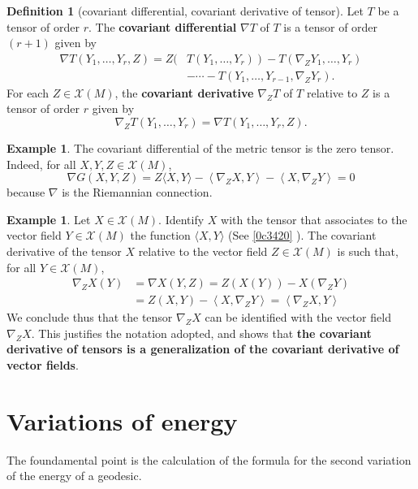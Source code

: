 \documentclass{amsart}
\theoremstyle{plain}
\theoremstyle{definition}
\newtheorem{definition}[theorem]{Definition}
\newtheorem{example}[theorem]{Example}
\theoremstyle{remark}
\begin{document}
\begin{definition}[covariant differential, covariant derivative of tensor]
Let $T$ be a tensor of order $r$. The \textbf{covariant differential} $\nabla T$ of $T$ is a tensor of order $(r+1)$ given by
\[
\begin{aligned}
\nabla T\left(Y_1, \ldots, Y_r, Z\right)=Z( & \left.T\left(Y_1, \ldots, Y_r\right)\right)-T\left(\nabla_Z Y_1, \ldots, Y_r\right) \\
& -\cdots-T\left(Y_1, \ldots, Y_{r-1}, \nabla_Z Y_r\right) .
\end{aligned}
\]For each $Z \in \mathcal{X}(M)$, the \textbf{covariant derivative} $\nabla_Z T$ of $T$ relative to $Z$ is a tensor of order $r$ given by
\[
\nabla_Z T\left(Y_1, \ldots, Y_r\right)=\nabla T\left(Y_1, \ldots, Y_r, Z\right) .
\]
\end{definition}
\begin{example}
The covariant differential of the metric tensor is the zero tensor. Indeed, for all $X, Y, Z \in \mathcal{X}(M)$,
\[
\nabla G(X, Y, Z)=Z\langle X, Y\rangle-\left\langle\nabla_Z X, Y\right\rangle-\left\langle X, \nabla_Z Y\right\rangle=0
\]because $\nabla$ is the Riemannian connection.
\end{example}
\begin{example}
Let $X \in \mathcal{X}(M)$. Identify $X$ with the tensor that associates to the vector field $Y \in \mathcal{X}(M)$ the function $\langle X, Y\rangle$ (See \cref{0c3420} ). The covariant derivative of the tensor $X$ relative to the vector field $Z \in \mathcal{X}(M)$ is such that, for all $Y \in \mathcal{X}(M)$,
\[
\begin{aligned}
\nabla_Z X(Y) & =\nabla X(Y, Z)=Z(X(Y))-X\left(\nabla_Z Y\right) \\
& =Z(X, Y)-\left\langle X, \nabla_Z Y\right\rangle=\left\langle\nabla_Z X, Y\right\rangle
\end{aligned}
\]We conclude thus that the tensor $\nabla_Z X$ can be identified with the vector field $\nabla_Z X$. This justifies the notation adopted, and shows that \textbf{the covariant derivative of tensors is a generalization of the covariant derivative of vector fields}.
\end{example}
\section{Variations of energy}

The foundamental point is the calculation of the formula for the second variation of the energy of a geodesic.
\end{document}
